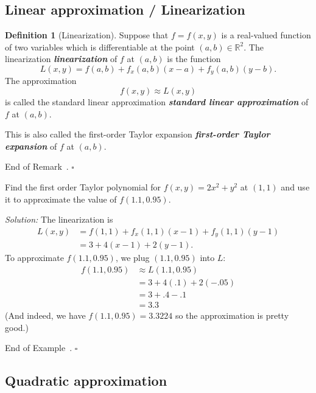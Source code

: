 \documentclass[10pt]{article}
\DeclareRobustCommand{\demph}[1]{%
  \ifmmode
  {\color{Blue}#1}%
  \else
  {\color{Blue}\bfseries\slshape #1}%
  \fi
}
\newtheorem{remark}[theorem]{Remark}
\theoremstyle{definition}
\newtheorem{definition}[theorem]{Definition}
\newtheorem{example}[theorem]{Example}
\renewenvironment{example}
{\begin{oldexample}}
  {\par\smallskip\hfill   End of Example~\theexample. $\square$    \par\end{oldexample}}
\renewenvironment{remark}
{\begin{oldremark}} 
  {\par\smallskip\hfill   End of Remark~\theremark. $\square$    \par\end{oldremark}}
\newcommand{\1}[1]{\textbf{1}_{\left[#1\right]}} %
\def\R{\mathbb{R}} %
\begin{document}
\subsection{Linear approximation / Linearization}

\begin{definition}[Linearization]
  Suppose that $f=f(x,y)$ is a real-valued function of two variables which is
  differentiable at the point $(a,b)\in \R^{2}$. The \demph{linearization} of
  $f$ at $(a,b)$ is the function
  \begin{equation*}
    L(x,y) = f(a,b) + f_{x}(a,b)(x-a)+ f_{y}(a,b)(y-b). 
  \end{equation*}
  The approximation
  \begin{equation*}
    f(x,y)\approx L(x,y)
  \end{equation*}
  is called the \demph{standard linear approximation} of $f$ at $(a,b)$.
\end{definition}
\begin{remark}
  This is also called the \demph{first-order Taylor expansion} of $f$ at
  $(a,b)$.
\end{remark}

\begin{example}
  Find the first order Taylor polynomial for $f(x,y) = 2x^{2}+y^{2}$ at
  $(1,1)$ and use it to approximate the value of $f(1.1,0.95)$.

  \textit{Solution:} The linearization is
  \begin{align*}
    L(x,y) 
    &= f(1,1)+f_{x}(1,1)(x-1)+f_{y}(1,1)(y-1)\\
    &=3+4(x-1)+2(y-1).
  \end{align*}
  To approximate $f(1.1,0.95)$, we plug $(1.1,0.95)$ into $L$:
  \begin{align*}
    f(1.1,0.95) 
    &\approx L(1.1,0.95)\\
    &=3+4(.1)+2(-.05)\\
    &=3+.4-.1\\
    &=3.3
  \end{align*}
  (And indeed, we have $f(1.1,0.95)=3.3224$ so the approximation is pretty
  good.)
\end{example}



\subsection{Quadratic approximation}
\end{document}
